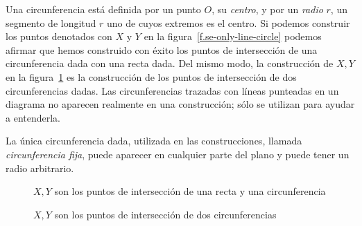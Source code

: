 Una circunferencia está definida por un punto $O$, su \emph{centro}, y por un \emph{radio} $r$, un segmento de longitud $r$ uno de cuyos extremos es el centro. Si podemos construir los puntos denotados con $X$ y $Y$ en la figura~\ref{f.se-only-line-circle} podemos afirmar que hemos construido con éxito los puntos de intersección de una circunferencia dada con una recta dada. Del mismo modo, la construcción de $X,Y$ en la figura~\ref{f.se-only-two-circles} es la construcción de los puntos de intersección de dos circunferencias dadas. Las  circunferencias trazadas
 con líneas punteadas en un diagrama no aparecen realmente en una construcción; sólo se utilizan para ayudar a entenderla.

La única circunferencia dada, utilizada en las construcciones, llamada \emph{circunferencia fija}, puede aparecer en cualquier parte del plano y puede tener un radio arbitrario.

\begin{figure}%
\begin{minipage}{.45\textwidth}
\begin{center}
\caption{$X,Y$ son los puntos de intersección de una recta y una circunferencia}\label{f.se-only-line-circle}
\end{center}
\end{minipage}
\hfill
\begin{minipage}{.45\textwidth}
\begin{center}
\caption{$X,Y$ son los puntos de intersección de dos circunferencias}\label{f.se-only-two-circles}
\end{center}
\end{minipage}
\end{figure}

